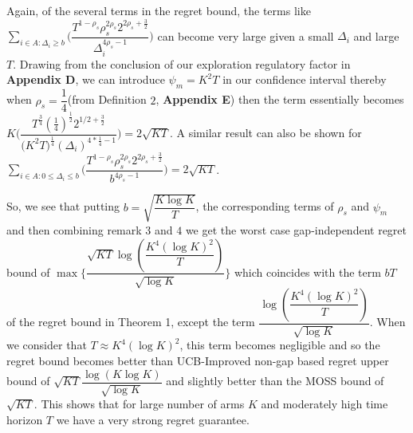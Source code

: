 \begin{remark}
Again, of the several terms in the regret bound, the terms like  $\sum_{i\in A:\Delta_{i}\geq b}\bigg(\dfrac{T^{1-\rho_{s}}\rho_{s}^{2\rho_{s}}2^{2\rho_{s}+\frac{3}{2}}}{\Delta_{i}^{4\rho_{s}-1}} \bigg)$ can become very large given a small $\Delta_{i}$ and large $T$. Drawing from the conclusion of our exploration regulatory factor in \textbf{Appendix D}, we can introduce $\psi_{m}=K^{2}T$ in our confidence interval thereby when $\rho_{s}=\dfrac{1}{4}$(from Definition $2$, \textbf{Appendix E}) then the term essentially becomes $K\bigg(\dfrac{T^{\frac{3}{4}}(\frac{1}{4})^{\frac{1}{2}}2^{1/2+\frac{3}{2}}}{{(K^{2}T})^{\frac{1}{4}}{(\Delta_{i})^{4*\frac{1}{4}-1}}} \bigg) = 2\sqrt{KT}$. A similar result can also be shown for $\sum_{i\in A:0\leq\Delta_{i}\leq b}\bigg(\dfrac{T^{1-\rho_{s}}\rho_{s}^{2\rho_{s}}2^{2\rho_{s}+\frac{3}{2}}}{b^{4\rho_{s} -1}} \bigg)=2\sqrt{KT}$. 
\end{remark}

\begin{remark}
So, we see that putting $b=\sqrt{\dfrac{K\log K}{T}}$, the corresponding terms of $\rho_{s}$ and $\psi_{m}$ and then combining remark $3$ and $4$ we get the worst case gap-independent regret bound of $\max\lbrace \dfrac{\sqrt{KT}\log{(\dfrac{K^{4}(\log K)^{2}}{T})}}{\sqrt{\log K}}\rbrace$ which coincides with the term $bT$ of the regret bound in Theorem 1, except the term  $\dfrac{\log{(\dfrac{K^{4}(\log K)^{2}}{T})}}{\sqrt{\log K}}$. When we consider that $T\approx K^{4}(\log K)^{2}$, this term becomes negligible and so the regret bound becomes better than UCB-Improved non-gap based regret upper bound of $\sqrt{KT}\dfrac{\log(K\log K)}{\sqrt{\log K}}$ and slightly better than the MOSS bound of $\sqrt{KT}$. This shows that for large number of arms $K$ and moderately high time horizon $T$ we have a very strong regret guarantee.
\end{remark}


